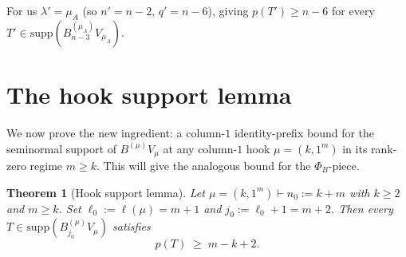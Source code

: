 \documentclass[11pt]{article}
\newtheorem{theorem}{Theorem}
\theoremstyle{definition}
\newcommand{\supp}{\mathrm{supp}}
\begin{document}
For us $\lambda' = \mu_A$ (so $n' = n - 2$, $q' = n - 6$), giving
$p(T') \ge n - 6$ for every $T' \in \supp(B^{(\mu_A)}_{n-3} V_{\mu_A})$.

\section{The hook support lemma}\label{sec:hook}

We now prove the new ingredient: a column-$1$ identity-prefix bound
for the seminormal support of $B^{(\mu)} V_\mu$ at any column-$1$
hook $\mu = (k, 1^m)$ in its rank-zero regime $m \ge k$.  This will
give the analogous bound for the $\Phi_B$-piece.

\begin{theorem}[Hook support lemma]\label{thm:hook-support}
Let $\mu = (k, 1^m) \vdash n_0 := k + m$ with $k \ge 2$ and $m \ge k$.
Set $\ell_0 := \ell(\mu) = m + 1$ and $j_0 := \ell_0 + 1 = m + 2$.
Then every $T \in \supp(B^{(\mu)}_{j_0} V_\mu)$ satisfies
\[
   p(T) \;\ge\; m - k + 2.
\]
\end{theorem}
\end{document}
